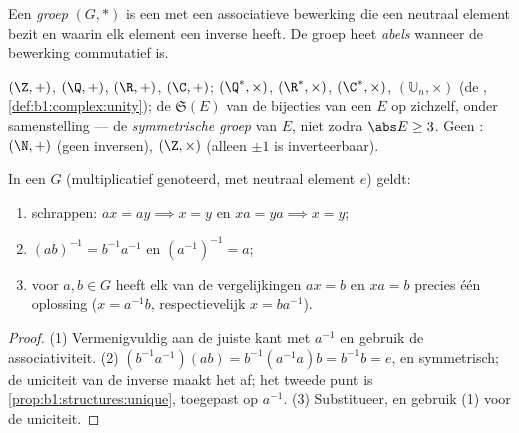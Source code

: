 \begin{definition}[Groep]\label{def:b1:structures:group}
Een \emph{groep} $(G, *)$ is een  met een
associatieve bewerking die een neutraal element bezit en waarin elk
element een inverse heeft. De groep heet
\emph{abels} wanneer de bewerking commutatief is.
\end{definition}

\begin{example}\label{ex:b1:structures:groups}
$(\Z, +)$, $(\Q, +)$, $(\R, +)$, $(\C, +)$; $(\Q^*, \times)$, $(\R^*,
\times)$, $(\C^*, \times)$, $(\mathbb{U}_n, \times)$ (de ,
\cref{def:b1:complex:unity}); de  $\mathfrak{S}(E)$ van de
bijecties van een  $E$ op zichzelf, onder samenstelling --- de
\emph{symmetrische groep} van $E$, niet 
zodra $\abs E \geq 3$. Geen : $(\N, +)$ (geen inversen), $(\Z,
\times)$ (alleen $\pm 1$ is inverteerbaar).
\end{example}

\begin{proposition}[Rekenregels]\label{prop:b1:structures:rules}
In een  $G$ (multiplicatief genoteerd, met neutraal element $e$)
geldt:
\begin{enumerate}
  \item schrappen: $ax = ay \implies x = y$ en $xa = ya \implies x = y$;
  \item $(ab)^{-1} = b^{-1} a^{-1}$ en $(a^{-1})^{-1} = a$;
  \item voor $a, b \in G$ heeft elk van de vergelijkingen $ax = b$ en $xa
        = b$ precies één oplossing ($x = a^{-1}b$, respectievelijk $x = b
        a^{-1}$).
\end{enumerate}
\end{proposition}

\begin{proof}
(1) Vermenigvuldig aan de juiste kant met $a^{-1}$ en gebruik de
associativiteit. (2) $(b^{-1}a^{-1})(ab) = b^{-1}(a^{-1}a)b = b^{-1}b =
e$, en symmetrisch; de uniciteit van de inverse maakt het af; het tweede
punt is \cref{prop:b1:structures:unique}, toegepast op $a^{-1}$. (3)
Substitueer, en gebruik (1) voor de uniciteit.
\end{proof}


